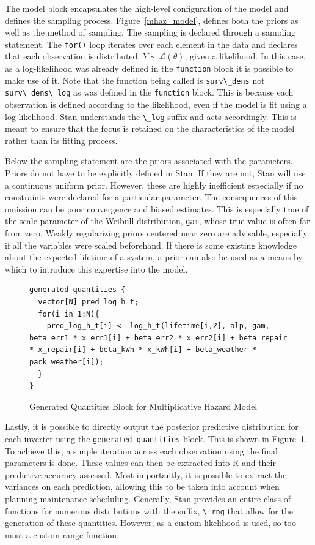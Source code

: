 The model block encapsulates the high-level configuration of the model and defines the sampling process. Figure~\ref{mhaz_model}, defines both the priors as well as the method of sampling. The sampling is declared through a sampling statement. The \lstinline{for()} loop iterates over each element in the data and declares that each observation is distributed, $Y \sim \mathcal {L}(\theta)$,  given a likelihood. In this case, as a log-likelihood was already defined in the \lstinline{function} block it is possible to make use of it. Note that the function being called is \lstinline{surv\_dens} not \lstinline{surv\_dens\_log} as was defined in the \lstinline{function} block. This is because each observation is defined according to the likelihood, even if the model is fit using a log-likelihood. Stan understands the \lstinline{\_log} suffix and acts accordingly. This is meant to ensure that the focus is retained on the characteristics of the model rather than its fitting process. 

Below the sampling statement are the priors associated with the parameters. Priors do not have to be explicitly defined in Stan. If they are not, Stan will use a continuous uniform prior. However, these are highly inefficient especially if no constraints were declared for a particular parameter. The consequences of this omission can be poor convergence and biased estimates. This is especially true of the scale parameter of the Weibull distribution, \lstinline{gam}, whose true value is often far from zero. Weakly regularizing priors centered near zero are advisable, especially if all the variables were scaled beforehand. If there is some existing knowledge about the expected lifetime of a system, a prior can also be used as a means by which to introduce this expertise into the model. 



\begin{figure}[htbp]
    \centering
    \begin{lstlisting}[belowskip=-2 \baselineskip]
generated quantities {
  vector[N] pred_log_h_t;
  for(i in 1:N){
    pred_log_h_t[i] <- log_h_t(lifetime[i,2], alp, gam, beta_err1 * x_err1[i] + beta_err2 * x_err2[i] + beta_repair * x_repair[i] + beta_kWh * x_kWh[i] + beta_weather * park_weather[i]);
  }
}
    \end{lstlisting}
    \caption{Generated Quantities Block for Multiplicative Hazard Model}
    \label{mhaz_quants}
\end{figure}

Lastly, it is possible to directly output the posterior predictive distribution for each inverter using the \lstinline{generated quantities} block. This is shown in Figure~\ref{mhaz_quants}. To achieve this, a simple iteration across each observation using the final parameters is done. These values can then be extracted into R and their predictive accuracy assessed. Most importantly, it is possible to extract the variances on each prediction, allowing this to be taken into account when planning maintenance scheduling. Generally, Stan provides an entire class of functions for numerous distributions with the suffix, \lstinline{\_rng} that allow for the generation of these quantities. However, as a custom likelihood is used, so too must a custom range function.

